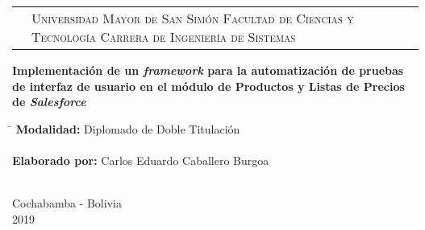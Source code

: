 \newcommand{\umsslogo}{
\adjustbox{valign=t}{}
}
\newcommand{\fcytlogo}{
\adjustbox{valign=t}{}
}

\begin{titlepage}

\begin{tabular}[t]{c p{8.6cm} c}
\umsslogo &
\vfill
\large{\textsc{Universidad Mayor de San Simón}} \newline
\large{\textsc{Facultad de Ciencias y Tecnología}} \newline
\large{\textsc{Carrera de Ingeniería de Sistemas}} &
\fcytlogo \\
\end{tabular}
\vfill
\begin{center}
\huge{\bf{Implementación de un \emph{framework} para la automatización de
pruebas de interfaz de usuario en el módulo de Productos y Listas de Precios
de \emph{Salesforce}}}
\end{center}
\vfill
\begin{tabbing}
\hspace{4cm}\=\+
\textbf{Modalidad:} Diplomado de Doble Titulación\\
\\
\textbf{Elaborado por:} Carlos Eduardo Caballero Burgoa\\
\\
\end{tabbing}
\begin{center}
Cochabamba - Bolivia\\
2019
\end{center}
\end{titlepage}

